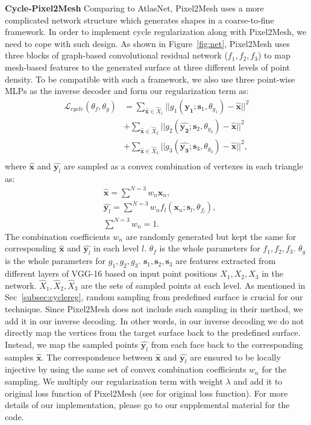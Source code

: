 \noindent\textbf{Cycle-Pixel2Mesh}
Comparing to AtlasNet, Pixel2Mesh uses a more complicated network structure which generates shapes in a coarse-to-fine framework. In order to implement cycle regularization along with Pixel2Mesh, we need to cope with such design.
As shown in Figure~\ref{fig:net}, Pixel2Mesh uses three blocks of graph-based convolutional residual network ($f_1,f_2,f_3$) to map mesh-based features to the generated surface at three different levels of point density. To be compatible with such a framework, we also use three point-wise MLPs as the inverse decoder and form our regularization term as:
\begin{equation}
\begin{aligned}
\mathcal{L}_{cycle}(\theta_f,\theta_g) 
&= \sum_{\hat{\mathbf{x}} \in \hat{X}_1}||g_{1}(\hat{\mathbf{y_1}};\mathbf{s}_1,\theta_{g_1}) - \hat{\mathbf{x}}||^2\\
&+ \sum_{\hat{\mathbf{x}} \in \hat{X}_2}||g_{2}(\hat{\mathbf{y_2}};\mathbf{s}_2,\theta_{g_2}) - \hat{\mathbf{x}}||^2\\
&+ \sum_{\hat{\mathbf{x}} \in \hat{X}_3}||g_{3}(\hat{\mathbf{y_3}};\mathbf{s}_3,\theta_{g_3}) - \hat{\mathbf{x}}||^2,\\
\end{aligned}
\end{equation}
where $\hat{\mathbf{x}}$ and $\hat{\mathbf{y}_l}$ are sampled as a convex combination of vertexes in each triangle as:
\begin{equation}
\begin{aligned}
\label{equ:sample}
&\hat{\mathbf{x}} = \sum^{N=3} w_n\mathbf{x}_n, \\
&\hat{\mathbf{y}_l} = \sum^{N=3} w_nf_l(\mathbf{x}_n;\mathbf{s}_l,\theta_{f_l}),\\
&\sum^{N=3} w_n = 1.
\end{aligned}
\end{equation}
The combination coefficients $w_n$ are randomly generated but kept the same for corresponding $\hat{\mathbf{x}}$ and $\hat{\mathbf{y}_l}$ in each level $l$. $\theta_f$ is the whole parameters for $f_1,f_2,f_3$. $\theta_g$ is the whole parameters for $g_1,g_2,g_3$. $\mathbf{s}_1,\mathbf{s}_2,\mathbf{s}_3$ are features extracted from different layers of VGG-16 based on input point positions $X_1,X_2,X_3$ in the network. $\hat{X}_1,\hat{X}_2,\hat{X}_3$ are the sets of sampled points at each level.
As mentioned in Sec~\ref{subsec:cyclereg}, random sampling from predefined surface is crucial for our technique. Since Pixel2Mesh does not include such sampling in their method, we add it in our inverse decoding. In other words, in our inverse decoding we do not directly map the vertices from the target surface back to the predefined surface. Instead, we map the sampled points $\hat{\mathbf{y}_l}$ from each face back to the corresponding samples $\hat{\mathbf{x}}$. The correspondence between $\hat{\mathbf{x}}$ and $\hat{\mathbf{y}_l}$ are ensured to be locally injective by using the same set of convex combination coefficients $w_n$ for the sampling. We multiply our regularization term with weight $\lambda$ and add it to original loss function of Pixel2Mesh (see \cite{pixel2mesh} for original loss function). For more details of our implementation, please go to our supplemental material for the code.
